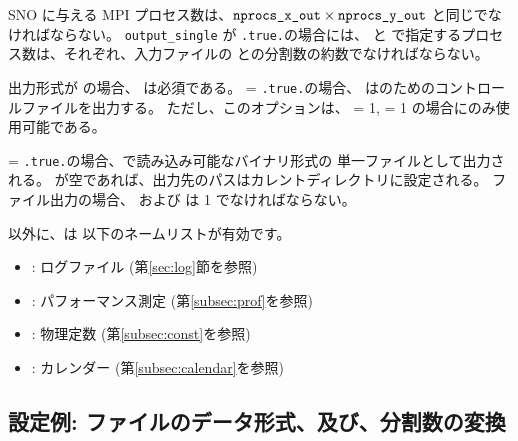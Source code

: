 SNO に与える MPI プロセス数は、$\nmitemeq{nprocs_x_out} \times \nmitemeq{nprocs_y_out}$ と同じでなければならない。
\verb|output_single| が \verb|.true.|の場合には、 と  で指定するプロセス数は、それぞれ、入力ファイルの \XDIR と\YDIR の分割数の約数でなければならない。


出力形式が \scalenetcdf の場合、 は必須である。
 = \verb|.true.|の場合、
\sno は{\grads}のためのコントロールファイルを出力する。
ただし、このオプションは、 = 1,  = 1 の場合にのみ使用可能である。



 = \verb|.true.|の場合、\grads で読み込み可能なバイナリ形式の
単一ファイルとして出力される。
が空であれば、出力先のパスはカレントディレクトリに設定される。
\grads ファイル出力の場合、 および  は 1 でなければならない。



以外に、\sno は 以下のネームリストが有効です。
%
\begin{itemize}
 \item {}: ログファイル (第\ref{sec:log}節を参照)
 \item {}: パフォーマンス測定 (第\ref{subsec:prof}を参照)
 \item {}: 物理定数 (第\ref{subsec:const}を参照)
 \item {}: カレンダー (第\ref{subsec:calendar}を参照)
\end{itemize}



\subsection{設定例: ファイルのデータ形式、及び、分割数の変換}

